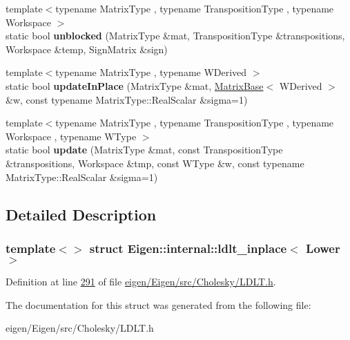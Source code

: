 \begin{DoxyCompactItemize}
{\footnotesize template$<$typename Matrix\+Type , typename Transposition\+Type , typename Workspace $>$ }\\static bool {\bfseries unblocked} (Matrix\+Type \&mat, Transposition\+Type \&transpositions, Workspace \&temp, Sign\+Matrix \&sign)
\item 
\mbox{\label{struct_eigen_1_1internal_1_1ldlt__inplace_3_01_lower_01_4_a108b58e95ea9d74496b78803311769dd}} 
{\footnotesize template$<$typename Matrix\+Type , typename W\+Derived $>$ }\\static bool {\bfseries update\+In\+Place} (Matrix\+Type \&mat, \hyperlink{group___core___module_class_eigen_1_1_matrix_base}{Matrix\+Base}$<$ W\+Derived $>$ \&w, const typename Matrix\+Type\+::\+Real\+Scalar \&sigma=1)
\item 
\mbox{\label{struct_eigen_1_1internal_1_1ldlt__inplace_3_01_lower_01_4_ae45df1fbda86712753262a9200f8c97b}} 
{\footnotesize template$<$typename Matrix\+Type , typename Transposition\+Type , typename Workspace , typename W\+Type $>$ }\\static bool {\bfseries update} (Matrix\+Type \&mat, const Transposition\+Type \&transpositions, Workspace \&tmp, const W\+Type \&w, const typename Matrix\+Type\+::\+Real\+Scalar \&sigma=1)
\end{DoxyCompactItemize}


\subsection{Detailed Description}
\subsubsection*{template$<$$>$\newline
struct Eigen\+::internal\+::ldlt\+\_\+inplace$<$ Lower $>$}



Definition at line \hyperlink{eigen_2_eigen_2src_2_cholesky_2_l_d_l_t_8h_source_l00291}{291} of file \hyperlink{eigen_2_eigen_2src_2_cholesky_2_l_d_l_t_8h_source}{eigen/\+Eigen/src/\+Cholesky/\+L\+D\+L\+T.\+h}.



The documentation for this struct was generated from the following file\+:\begin{DoxyCompactItemize}
\item 
eigen/\+Eigen/src/\+Cholesky/\+L\+D\+L\+T.\+h\end{DoxyCompactItemize}
